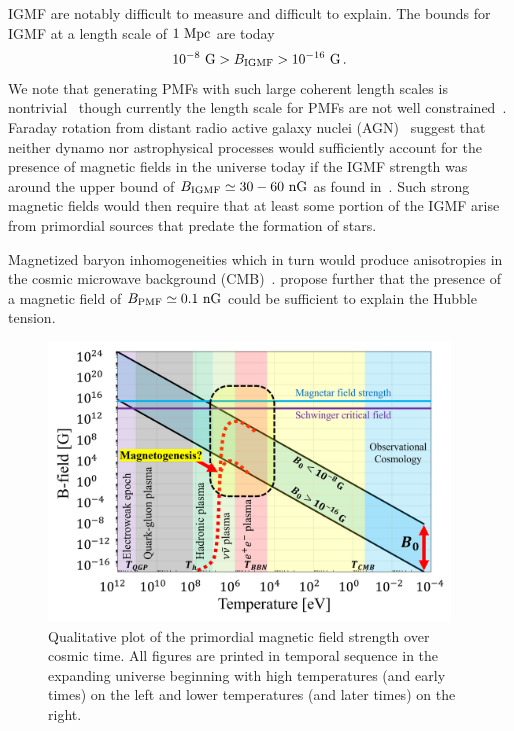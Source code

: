 IGMF are notably difficult to measure and difficult to explain. The bounds for IGMF at a length scale of $1{\rm\ Mpc}$ are today~\citep{Neronov:2010gir,Taylor:2011bn,Pshirkov:2015tua,Jedamzik:2018itu,Vernstrom:2021hru}
\begin{gather}
 \label{igmf}
 10^{-8}{\rm\ G}>B_\mathrm{IGMF}>10^{-16}{\rm\ G}\,.
\end{gather}
We note that generating PMFs with such large coherent length scales is nontrivial~\citep{Giovannini:2022rrl} though currently the length scale for PMFs are not well constrained~\citep{AlvesBatista:2021sln}. Faraday rotation from distant radio active galaxy nuclei (AGN)~\citep{Pomakov:2022cem} suggest that neither dynamo nor astrophysical processes would sufficiently account for the presence of magnetic fields in the universe today if the IGMF strength was around the upper bound of $B_\mathrm{IGMF}\simeq30-60{\rm\ nG}$ as found in~\cite{Vernstrom:2021hru}. Such strong magnetic fields would then require that at least some portion of the IGMF arise from primordial sources that predate the formation of stars.

Magnetized baryon inhomogeneities which in turn would produce anisotropies in the cosmic microwave background (CMB)~\citep{Jedamzik:2013gua,Abdalla:2022yfr}. \cite{Jedamzik:2020krr} propose further that the presence of a magnetic field of $B_\mathrm{PMF}\simeq0.1{\rm\ nG}$ could be sufficient to explain the Hubble tension.

\begin{figure}[ht]
    \centering
    \includegraphics[width=0.95\textwidth]{plots/chap04cosmo/pmf.png}
    \caption{Qualitative plot of the primordial magnetic field strength over cosmic time. All figures are printed in temporal sequence in the expanding universe beginning with high temperatures (and early times) on the left and lower temperatures (and later times) on the right.}
    \label{fig:pmf}
\end{figure}

